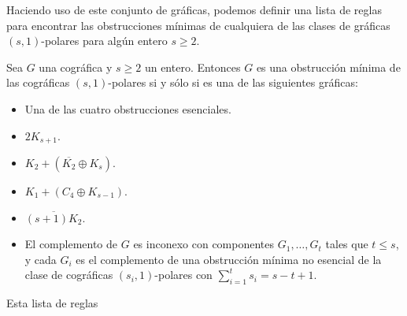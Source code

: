 Haciendo uso de este conjunto de gráficas, podemos definir una lista de reglas para encontrar las obstrucciones mínimas de cualquiera de las clases de gráficas $(s,1)$-polares para algún entero $s \geq 2$.

\begin{theorem}
    Sea $G$ una cográfica y $s \geq 2$ un entero. Entonces $G$ es una obstrucción mínima de las cográficas $(s,1)$-polares si y sólo si es una de las siguientes gráficas:
    
    \begin{itemize}
        \item Una de las cuatro obstrucciones esenciales.
        \item $2K_{s+1}$.
        \item $K_2 + (\overline{K_2}\oplus K_s)$.
        \item $K_1 + (C_4 \oplus K_{s-1})$.
        \item $\overline{(s+1)K_2}$.
        \item El complemento de $G$ es inconexo con componentes $G_1, \dots, G_t$ tales que $t \leq s$, y cada $G_i$ es el complemento de una obstrucción mínima no esencial de la clase de cográficas $(s_i, 1)$-polares con $\sum^{t}_{i=1}s_i = s-t+1$.
    \end{itemize}
    
\end{theorem}

Esta lista de reglas 

